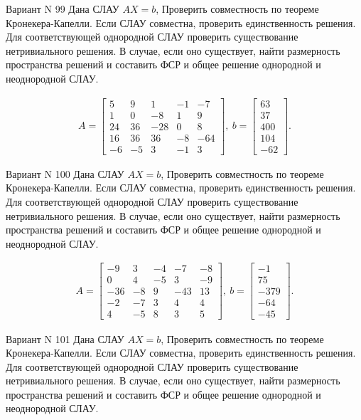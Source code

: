 \documentclass[11pt]{report}
\begin{document}
Вариант N 99
Дана СЛАУ $AX = b$,
Проверить совместность по теореме Кронекера-Капелли. Если СЛАУ совместна, проверить единственность решения.
Для соответствующей однородной СЛАУ проверить существование нетривиального решения. В случае, если оно существует,
найти размерность пространства решений и составить ФСР и общее решение однородной  и неоднородной СЛАУ.


\begin{align*}
 A = \left[\begin{matrix}5 & 9 & 1 & -1 & -7\\1 & 0 & -8 & 1 & 9\\24 & 36 & -28 & 0 & 8\\16 & 36 & 36 & -8 & -64\\-6 & -5 & 3 & -1 & 3\end{matrix}\right],
\ b = \left[\begin{matrix}63\\37\\400\\104\\-62\end{matrix}\right]. 
 \end{align*}

Вариант N 100
Дана СЛАУ $AX = b$,
Проверить совместность по теореме Кронекера-Капелли. Если СЛАУ совместна, проверить единственность решения.
Для соответствующей однородной СЛАУ проверить существование нетривиального решения. В случае, если оно существует,
найти размерность пространства решений и составить ФСР и общее решение однородной  и неоднородной СЛАУ.


\begin{align*}
 A = \left[\begin{matrix}-9 & 3 & -4 & -7 & -8\\0 & 4 & -5 & 3 & -9\\-36 & -8 & 9 & -43 & 13\\-2 & -7 & 3 & 4 & 4\\4 & -5 & 8 & 3 & 5\end{matrix}\right],
\ b = \left[\begin{matrix}-1\\75\\-379\\-64\\-45\end{matrix}\right]. 
 \end{align*}

Вариант N 101
Дана СЛАУ $AX = b$,
Проверить совместность по теореме Кронекера-Капелли. Если СЛАУ совместна, проверить единственность решения.
Для соответствующей однородной СЛАУ проверить существование нетривиального решения. В случае, если оно существует,
найти размерность пространства решений и составить ФСР и общее решение однородной  и неоднородной СЛАУ.
\end{document}
